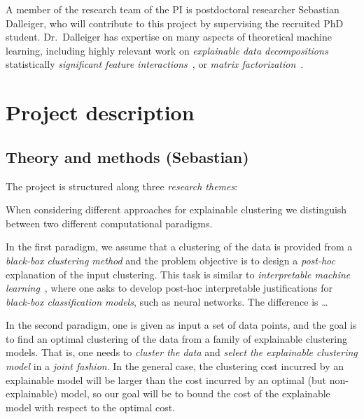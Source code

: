 \documentclass[a4paper,11pt]{article}
\begin{document}
A member of the research team of the PI is postdoctoral researcher Sebastian Dalleiger, 
who will contribute to this project by supervising the recruited PhD student.
Dr.\ Dalleiger has expertise on many aspects of theoretical machine learning, 
including highly relevant work on \emph{explainable data decompositions}~\cite{dalleiger2020explainable}
statistically \emph{significant feature interactions}~\cite{XXX}, 
or \emph{matrix factorization}~\cite{dalleiger2022efficiently}.

\section{Project description}


\subsection{Theory and methods {\color{teal}(Sebastian)}}


The project is structured along three {\em research themes}:

\begin{description}
\setlength{\itemsep}{-2pt}
\item[\rto.~\newmodels\,:] 

\item[\rtw.~\clusterings\,:] 

\item[\rth.~\covariates\,:]
\end{description}

When considering different approaches for explainable clustering we distinguish between 
two different computational paradigms. 
\begin{description}
\setlength{\itemsep}{-2pt}
\item[\posthoc\,:]
In the first paradigm, we assume that a clustering of the data is provided 
from a \emph{black-box clustering method} and the problem objective is to design 
a \emph{post-hoc} explanation of the input clustering.
This task is similar to \emph{interpretable machine learning}~\cite{XXX}, 
where one asks to develop post-hoc interpretable justifications for 
\emph{black-box classification models}, such as neural networks. 
The difference is \ldots 
\item[\joint\,:]
In the second paradigm, one is given as input a set of data points, 
and the goal is to find an optimal clustering of the data
from a family of explainable clustering models.
That is, one needs to \emph{cluster the data} and \emph{select the explainable clustering model}
in a \emph{joint fashion}.
In the general case, the clustering cost incurred by an explainable model 
will be larger than the cost incurred by an optimal (but non-explainable) model, 
so our goal will be to bound the cost of the explainable model with respect to the optimal cost.
\end{description}
\end{document}
